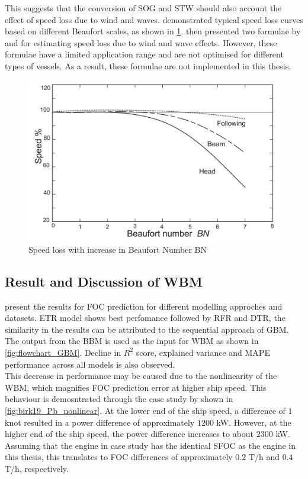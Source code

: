 This suggests that the conversion of SOG and STW should also account the effect of speed loss due to wind and waves.  demonstrated typical speed loss curves based on different Beaufort scales, as shown in \cref{fig:molland17_speedloss_windwave}.  then presented two formulae by  and  for estimating speed loss due to wind and wave effects. However, these formulae have a limited application range and are not optimised for different types of vessels. As a result, these formulae are not implemented in this thesis.\\ 

\begin{figure}
    \centering
    \includegraphics[width=.7\linewidth]{02_figures/molland17_speedlosscurve.jpg}
    \caption{Speed loss with increase in Beaufort Number BN }
    \label{fig:molland17_speedloss_windwave}
\end{figure}


\subsection{Result and Discussion of WBM}\label{sec:WBM_result_discussion}

 present the results for FOC prediction for different modelling approches and datasets. ETR model shows best perfomance followed by RFR and DTR, the similarity in the results can be attributed to the sequential approach of GBM. The output from the BBM is used as the input for WBM as shown in \cref{fig:flowchart_GBM}. Decline in $R^2$ score, explained variance and MAPE performance across all models is also observed.\\ 

This decrease in performance may be caused due to the nonlinearity of the WBM, which magnifies FOC prediction error at higher ship speed. This behaviour is demosntrated through the case study by  shown in \cref{fig:birk19_Pb_nonlinear}. At the lower end of the ship speed, a difference of $1$ knot resulted in a power difference of approximately $1200$ kW. However, at the higher end of the ship speed, the power difference increases to about $2300$ kW. Assuming that the engine in  case study has the identical SFOC as the engine in this thesis, this translates to FOC differences of approximately $0.2$ T/h and $0.4$ T/h, respectively.\\

